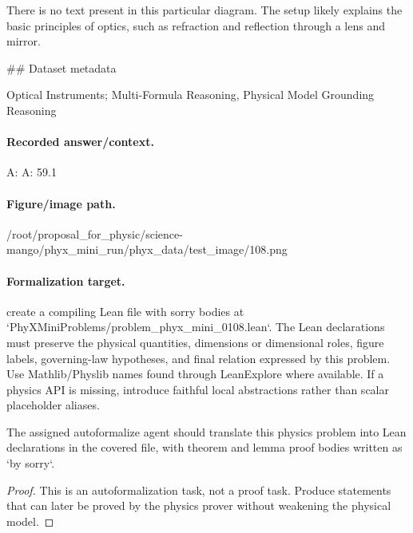 There is no text present in this particular diagram. The setup likely explains the basic principles of optics, such as refraction and reflection through a lens and mirror.

\#\# Dataset metadata

Optical Instruments; Multi-Formula Reasoning, Physical Model Grounding Reasoning

\paragraph{Recorded answer/context.}
A: A: 59.1

\paragraph{Figure/image path.}
/root/proposal\_for\_physic/science-mango/phyx\_mini\_run/phyx\_data/test\_image/108.png

\paragraph{Formalization target.}
create a compiling Lean file with sorry bodies at `PhyXMiniProblems/problem\_phyx\_mini\_0108.lean`. The Lean declarations must preserve the physical quantities, dimensions or dimensional roles, figure labels, governing-law hypotheses, and final relation expressed by this problem.
Use Mathlib/Physlib names found through LeanExplore where available. If a physics API is missing, introduce faithful local abstractions rather than scalar placeholder aliases.

\begin{theorem}
\label{thm:physics:phyx_mini_0108:target}
The assigned autoformalize agent should translate this physics problem into Lean declarations in the covered file, with theorem and lemma proof bodies written as `by sorry`.
\end{theorem}
\begin{proof}
This is an autoformalization task, not a proof task. Produce statements that can later be proved by the physics prover without weakening the physical model.
\end{proof}

